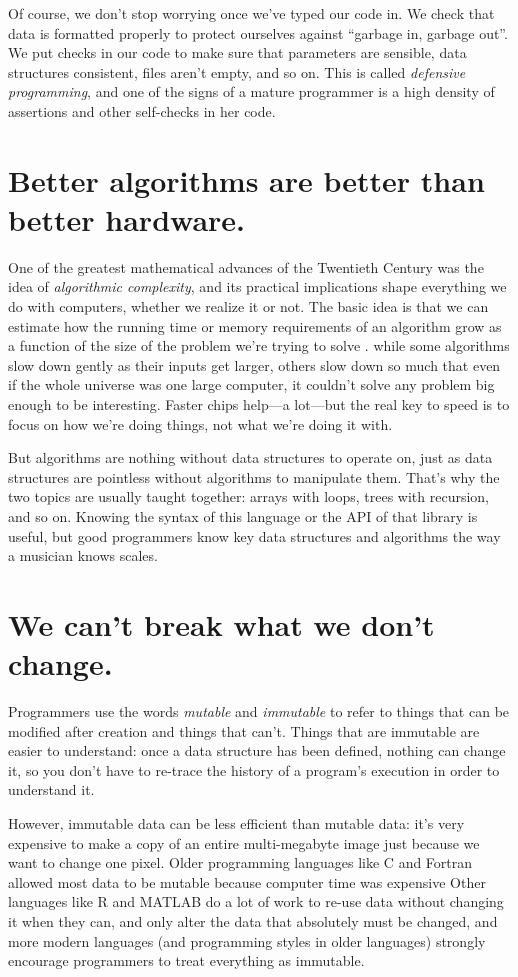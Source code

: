 \documentclass[10pt,letterpaper]{article}
\newcommand{\rulemajor}[1]{\section{#1}}
\begin{document}
Of course, we don't stop worrying once we've typed our code in.  We check that
data is formatted properly to protect ourselves against ``garbage in, garbage
out''.  We put checks in our code to make sure that parameters are sensible,
data structures consistent, files aren't empty, and so on.  This is called
\emph{defensive programming}, and one of the signs of a mature programmer is
a high density of assertions and other self-checks in her code.

\rulemajor{Better algorithms are better than better hardware.}

One of the greatest mathematical advances of the Twentieth Century was the idea
of \emph{algorithmic complexity}, and its practical implications shape
everything we do with computers, whether we realize it or not.  The basic idea
is that we can estimate how the running time or memory requirements of an
algorithm grow as a function of the size of the problem we're trying to solve
\cite{Cone2016}.  while some algorithms slow down gently as their inputs get
larger, others slow down so much that even if the whole universe was one large
computer, it couldn't solve any problem big enough to be interesting.  Faster
chips help---a lot---but the real key to speed is to focus on how we're doing
things, not what we're doing it with.

But algorithms are nothing without data structures to operate on, just as data
structures are pointless without algorithms to manipulate them.  That's why the
two topics are usually taught together: arrays with loops, trees with recursion,
and so on.  Knowing the syntax of this language or the API of that library is
useful, but good programmers know key data structures and algorithms the way a
musician knows scales.

\rulemajor{We can't break what we don't change.}

Programmers use the words \emph{mutable} and \emph{immutable} to refer to things
that can be modified after creation and things that can't.  Things that are
immutable are easier to understand: once a data structure has been defined,
nothing can change it, so you don't have to re-trace the history of a program's
execution in order to understand it.

However, immutable data can be less efficient than mutable data: it's very
expensive to make a copy of an entire multi-megabyte image just because we want
to change one pixel.  Older programming languages like C and Fortran allowed
most data to be mutable because computer time was expensive Other languages like
R and MATLAB do a lot of work to re-use data without changing it when they can,
and only alter the data that absolutely must be changed, and more modern
languages (and programming styles in older languages) strongly encourage
programmers to treat everything as immutable.
\end{document}
